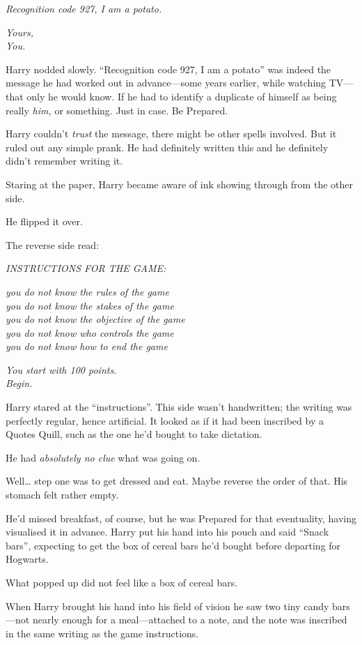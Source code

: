 \emph{Recognition code 927, I am a potato.}

\emph{Yours,}\\\emph{You.}

Harry nodded slowly. ``Recognition code 927, I am a potato'' was indeed
the message he had worked out in advance---some years earlier, while
watching TV---that only he would know. If he had to identify a duplicate
of himself as being really \emph{him,} or something. Just in case. Be
Prepared.

Harry couldn't \emph{trust} the message, there might be other spells
involved. But it ruled out any simple prank. He had definitely written
this and he definitely didn't remember writing it.

Staring at the paper, Harry became aware of ink showing through from the
other side.

He flipped it over.

The reverse side read:

\emph{INSTRUCTIONS FOR THE GAME:}

\emph{you do not know the rules of the game}\\\emph{you do not know the
stakes of the game}\\\emph{you do not know the objective of the
game}\\\emph{you do not know who controls the game}\\\emph{you do not
know how to end the game}

\emph{You start with 100 points.}\\\emph{Begin.}

Harry stared at the ``instructions''. This side wasn't handwritten; the
writing was perfectly regular, hence artificial. It looked as if it had
been inscribed by a Quotes Quill, such as the one he'd bought to take
dictation.

He had \emph{absolutely no clue} what was going on.

Well\ldots{} step one was to get dressed and eat. Maybe reverse the
order of that. His stomach felt rather empty.

He'd missed breakfast, of course, but he was Prepared for that
eventuality, having visualised it in advance. Harry put his hand into
his pouch and said ``Snack bars'', expecting to get the box of cereal
bars he'd bought before departing for Hogwarts.

What popped up did not feel like a box of cereal bars.

When Harry brought his hand into his field of vision he saw two tiny
candy bars---not nearly enough for a meal---attached to a note, and the
note was inscribed in the same writing as the game instructions.

